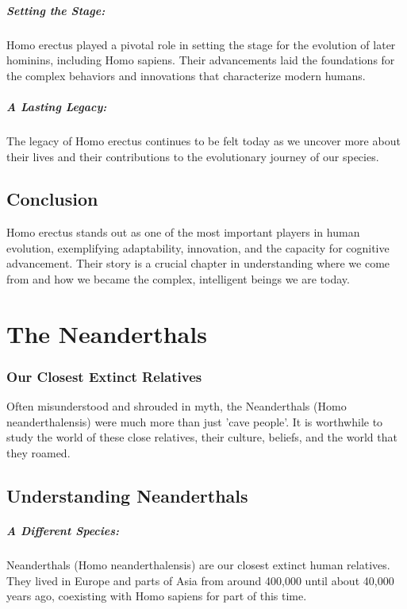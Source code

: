 \documentclass{book}
\begin{document}
\paragraph{Setting the Stage:}
Homo erectus played a pivotal role in setting the stage for the evolution of later hominins, including Homo sapiens. Their advancements laid the foundations for the complex behaviors and innovations that characterize modern humans.

\paragraph{A Lasting Legacy:}
The legacy of Homo erectus continues to be felt today as we uncover more about their lives and their contributions to the evolutionary journey of our species.

\section*{Conclusion}

Homo erectus stands out as one of the most important players in human evolution, exemplifying adaptability, innovation, and the capacity for cognitive advancement. Their story is a crucial chapter in understanding where we come from and how we became the complex, intelligent beings we are today.

\chapter{The Neanderthals}
\subsection*{Our Closest Extinct Relatives}
Often misunderstood and shrouded in myth, the Neanderthals (Homo neanderthalensis) were much more than just 'cave people'. It is worthwhile to study the world of these close relatives, their culture, beliefs, and the world that they roamed.

\section*{Understanding Neanderthals}

\paragraph{A Different Species:}
Neanderthals (Homo neanderthalensis) are our closest extinct human relatives. They lived in Europe and parts of Asia from around 400,000 until about 40,000 years ago, coexisting with Homo sapiens for part of this time.
\end{document}
